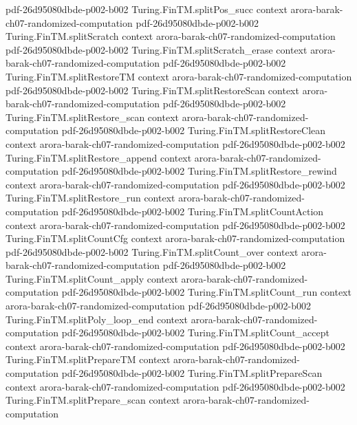 \begin{theorem}
  {pdf-26d95080dbde-p002-b002}
\proofstep
  {Turing.FinTM.splitPos_succ}
  {context}
  {arora-barak-ch07-randomized-computation}
  {pdf-26d95080dbde-p002-b002}
\proofstep
  {Turing.FinTM.splitScratch}
  {context}
  {arora-barak-ch07-randomized-computation}
  {pdf-26d95080dbde-p002-b002}
\proofstep
  {Turing.FinTM.splitScratch_erase}
  {context}
  {arora-barak-ch07-randomized-computation}
  {pdf-26d95080dbde-p002-b002}
\proofstep
  {Turing.FinTM.splitRestoreTM}
  {context}
  {arora-barak-ch07-randomized-computation}
  {pdf-26d95080dbde-p002-b002}
\proofstep
  {Turing.FinTM.splitRestoreScan}
  {context}
  {arora-barak-ch07-randomized-computation}
  {pdf-26d95080dbde-p002-b002}
\proofstep
  {Turing.FinTM.splitRestore_scan}
  {context}
  {arora-barak-ch07-randomized-computation}
  {pdf-26d95080dbde-p002-b002}
\proofstep
  {Turing.FinTM.splitRestoreClean}
  {context}
  {arora-barak-ch07-randomized-computation}
  {pdf-26d95080dbde-p002-b002}
\proofstep
  {Turing.FinTM.splitRestore_append}
  {context}
  {arora-barak-ch07-randomized-computation}
  {pdf-26d95080dbde-p002-b002}
\proofstep
  {Turing.FinTM.splitRestore_rewind}
  {context}
  {arora-barak-ch07-randomized-computation}
  {pdf-26d95080dbde-p002-b002}
\proofstep
  {Turing.FinTM.splitRestore_run}
  {context}
  {arora-barak-ch07-randomized-computation}
  {pdf-26d95080dbde-p002-b002}
\proofstep
  {Turing.FinTM.splitCountAction}
  {context}
  {arora-barak-ch07-randomized-computation}
  {pdf-26d95080dbde-p002-b002}
\proofstep
  {Turing.FinTM.splitCountCfg}
  {context}
  {arora-barak-ch07-randomized-computation}
  {pdf-26d95080dbde-p002-b002}
\proofstep
  {Turing.FinTM.splitCount_over}
  {context}
  {arora-barak-ch07-randomized-computation}
  {pdf-26d95080dbde-p002-b002}
\proofstep
  {Turing.FinTM.splitCount_apply}
  {context}
  {arora-barak-ch07-randomized-computation}
  {pdf-26d95080dbde-p002-b002}
\proofstep
  {Turing.FinTM.splitCount_run}
  {context}
  {arora-barak-ch07-randomized-computation}
  {pdf-26d95080dbde-p002-b002}
\proofstep
  {Turing.FinTM.splitPoly_loop_end}
  {context}
  {arora-barak-ch07-randomized-computation}
  {pdf-26d95080dbde-p002-b002}
\proofstep
  {Turing.FinTM.splitCount_accept}
  {context}
  {arora-barak-ch07-randomized-computation}
  {pdf-26d95080dbde-p002-b002}
\proofstep
  {Turing.FinTM.splitPrepareTM}
  {context}
  {arora-barak-ch07-randomized-computation}
  {pdf-26d95080dbde-p002-b002}
\proofstep
  {Turing.FinTM.splitPrepareScan}
  {context}
  {arora-barak-ch07-randomized-computation}
  {pdf-26d95080dbde-p002-b002}
\proofstep
  {Turing.FinTM.splitPrepare_scan}
  {context}
  {arora-barak-ch07-randomized-computation}

\end{theorem}

